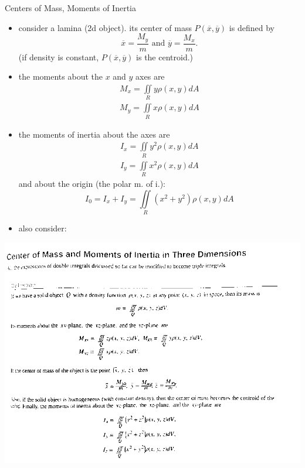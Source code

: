 \documentclass[11pt]{article}
\theoremstyle{definition}
\newcommand{\col}[1]{\begin{minipage}{\columnwidth}#1\end{minipage}}
\begin{document}
\begin{multicols}{2}
  \col{
    Centers of Mass, Moments of Inertia
    \begin{itemize}
      \item consider a lamina (2d object). its center of mass $P(\overline{x},\overline{y})$ is defined by
      \[ \overline{x} = \frac{M_y}{m} \text{ and } \overline{y} = \frac{M_x}{m}. \]
      (if density is constant, $P(\overline{x},\overline{y})$ is the centroid.)

      \item the moments about the $x$ and $y$ axes are
      \begin{gather*}
        M_x = \iint\limits_R y\rho(x,y)dA \\
        M_y = \iint\limits_R x\rho(x,y)dA
      \end{gather*}
      \item the moments of inertia about the axes are
      \begin{gather*}
        I_x = \iint\limits_R y^2\rho(x,y)dA \\
        I_y = \iint\limits_R x^2\rho(x,y)dA
      \end{gather*}
      and about the origin (the polar m. of i.):
      \[ I_0 = I_x + I_y = \iint\limits_R (x^2+y^2)\rho(x,y)dA \]
      \item also consider:
    \end{itemize}
    \includegraphics[width=\textwidth]{3d_moments_of_inertia.png}
  }
  \col{

  }
\end{multicols}
\end{document}
